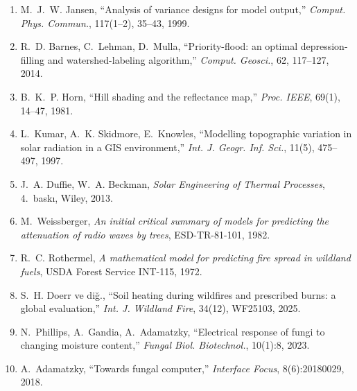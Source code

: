 \documentclass[11pt,a4paper]{article}
\begin{document}
\begin{enumerate}
output,'' \emph{Comput. Phys. Commun.}, 181(2), 259--270, 2010.
\item M.~J.~W. Jansen, ``Analysis of variance designs for model output,''
\emph{Comput. Phys. Commun.}, 117(1--2), 35--43, 1999.
\item R.~D. Barnes, C.~Lehman, D.~Mulla, ``Priority-flood: an optimal
depression-filling and watershed-labeling algorithm,'' \emph{Comput. Geosci.},
62, 117--127, 2014.
\item B.~K.~P. Horn, ``Hill shading and the reflectance map,''
\emph{Proc. IEEE}, 69(1), 14--47, 1981.
\item L.~Kumar, A.~K. Skidmore, E.~Knowles, ``Modelling topographic variation
in solar radiation in a GIS environment,'' \emph{Int. J. Geogr. Inf. Sci.},
11(5), 475--497, 1997.
\item J.~A. Duffie, W.~A. Beckman, \emph{Solar Engineering of Thermal
Processes}, 4.~baskı, Wiley, 2013.
\item M.~Weissberger, \emph{An initial critical summary of models for
predicting the attenuation of radio waves by trees}, ESD-TR-81-101, 1982.
\item R.~C. Rothermel, \emph{A mathematical model for predicting fire spread
in wildland fuels}, USDA Forest Service INT-115, 1972.
\item S.~H. Doerr ve diğ., ``Soil heating during wildfires and prescribed
burns: a global evaluation,'' \emph{Int. J. Wildland Fire}, 34(12), WF25103,
2025.
\item N.~Phillips, A.~Gandia, A.~Adamatzky, ``Electrical response of fungi to
changing moisture content,'' \emph{Fungal Biol. Biotechnol.}, 10(1):8, 2023.
\item A.~Adamatzky, ``Towards fungal computer,'' \emph{Interface Focus},
8(6):20180029, 2018.
\end{enumerate}
\end{document}

